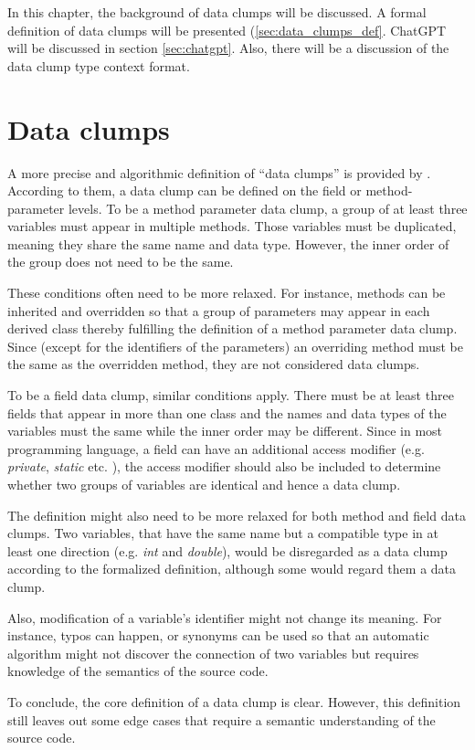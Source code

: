 In this chapter, the background of data clumps will be discussed. A formal definition of data clumps will be presented (\ref{sec:data_clumps_def}. ChatGPT will be discussed in section \ref{sec:chatgpt}. Also, there will be a discussion of the data clump type context format. 

\section{Data clumps}\label{sec:sec:data_clump_def}

A more precise and algorithmic  definition of \enquote{data clumps} is provided by \cite{zhangImprovingPrecisionFowler2008}. According to them, a data clump  can be defined on the field or method-parameter levels. 
To be a method parameter data clump, a group of at least three variables must appear in multiple methods. Those variables must be duplicated, meaning they share the same name and data type. However, the inner order of the group does not need to be the same. 

These conditions often need to be more relaxed. For instance, methods can be inherited and overridden so that a group of parameters may appear in each derived class thereby fulfilling the definition of a method parameter data clump. Since (except for the identifiers of the parameters) an overriding method must be the same as the overridden method, they are not considered data clumps. \cite{zhangImprovingPrecisionFowler2008}

To be a field data clump, similar conditions apply. There must be at least three fields that appear in more than one class and the names and data types of the variables must the same while the inner order may be different. Since in most programming language, a field can have an additional access modifier (e.g. \textit{private}, \textit{static} etc. ), the access modifier should also be included to determine whether two groups of variables are identical and hence a data clump.  \cite{zhangImprovingPrecisionFowler2008}

The definition might also need to be more relaxed for both method and field data clumps. Two variables, that have the same name but a compatible type in at least one direction  (e.g. \textit{int} and  \textit{double}), would be disregarded as a data clump according to the formalized definition, although some would regard them a data clump.

Also, modification of a variable's identifier might not change its meaning. For instance, typos can happen, or synonyms can be used so that an automatic algorithm might not discover the connection of two variables but requires  knowledge of the semantics of the source code. \cite{zhangImprovingPrecisionFowler2008}


To conclude, the core definition of a data clump is clear. However, this definition still leaves out some edge cases that require a semantic understanding of the source code.  

